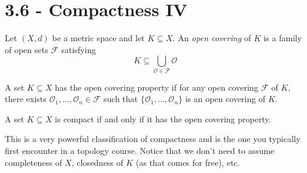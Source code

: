 \section{3.6 - Compactness IV}
\begin{defn}
    Let $(X,d)$ be a metric space and let $K \subseteq X$. 
    An \emph{open covering} of $K$ is a family of open sets 
    $\mathcal F$ satisfying 
    \[
        K \subseteq \bigcup_{\mathcal O \in \mathcal F} \mathcal O
    \]
\end{defn}
\begin{defn}
    A set $K \subseteq X$ has the open covering property if 
    for any open covering $\mathcal F$ of $K$, 
    there exists $\mathcal O_1,\ldots,\mathcal O_n \in \mathcal F$
    such that $\{\mathcal O_1,\ldots, \mathcal O_n\}$ is an 
    open covering of $K$.
\end{defn}
\begin{thm}
    A set $K \subseteq X$ is compact if and only if it has 
    the open covering property. 
\end{thm}
This is a very powerful classification of compactness and is the 
one you typically first encounter in a topology course. 
Notice that we don't need to assume completeness of $X$, 
closedness of $K$ (as that comes for free), etc. 

\newpage 
